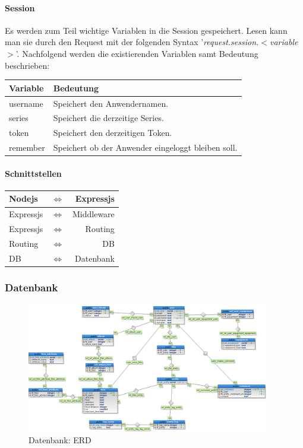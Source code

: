 \documentclass[a4paper,bibtotoc,oneside]{scrartcl}	%
\begin{document}
			\paragraph{Session}
			Es werden zum Teil wichtige Variablen in die Session gespeichert. Lesen kann man sie durch den Request mit der folgenden Syntax '\textit{request.session.$<$variable$>$}'. Nachfolgend werden die existierenden Variablen samt Bedeutung beschrieben:
			
			\begin{center}
			\begin{tabular}{|l|l|}
			\hline
			\bf Variable & \bf Bedeutung \\
			\hline
			username & Speichert den Anwendernamen. \\
			series & Speichert die derzeitige Series. \\
			token & Speichert den derzeitigen Token. \\
			remember & Speichert ob der Anwender eingeloggt bleiben soll. \\
			\hline
			\end{tabular}
			\end{center}
			
			\paragraph{Schnittstellen}
			\begin{center}
			\begin{tabular}{|lcr|}
			\hline
			Nodejs & $\Leftrightarrow$ & Expressjs \\
			\hline
			Expressjs & $\Leftrightarrow$ & Middleware \\
			\hline
			Expressjs & $\Leftrightarrow$ & Routing \\
			\hline
			Routing & $\Leftrightarrow$ & DB \\
			\hline
			DB & $\Leftrightarrow$ & Datenbank \\
			\hline
			\end{tabular}
			\end{center}
			
		\subsubsection{Datenbank}

			\begin{figure}[H]
			\centering
			\includegraphics[width=400px]{Mockups/db_v1.png}
			\caption{Datenbank: ERD}
			\end{figure}
\end{document}
